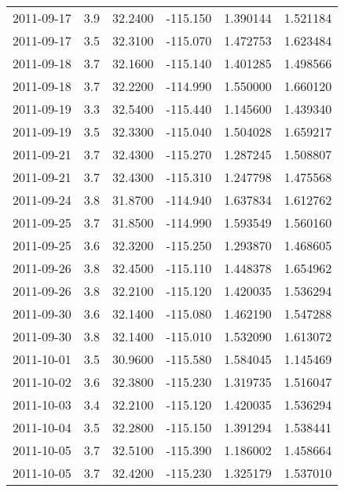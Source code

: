 \begin{tabular}{lrrrrr}
2011-09-17 &       3.9 &  32.2400 &  -115.150 &         1.390144 &         1.521184 \\
2011-09-17 &       3.5 &  32.3100 &  -115.070 &         1.472753 &         1.623484 \\
2011-09-18 &       3.7 &  32.1600 &  -115.140 &         1.401285 &         1.498566 \\
2011-09-18 &       3.7 &  32.2200 &  -114.990 &         1.550000 &         1.660120 \\
2011-09-19 &       3.3 &  32.5400 &  -115.440 &         1.145600 &         1.439340 \\
2011-09-19 &       3.5 &  32.3300 &  -115.040 &         1.504028 &         1.659217 \\
2011-09-21 &       3.7 &  32.4300 &  -115.270 &         1.287245 &         1.508807 \\
2011-09-21 &       3.7 &  32.4300 &  -115.310 &         1.247798 &         1.475568 \\
2011-09-24 &       3.8 &  31.8700 &  -114.940 &         1.637834 &         1.612762 \\
2011-09-25 &       3.7 &  31.8500 &  -114.990 &         1.593549 &         1.560160 \\
2011-09-25 &       3.6 &  32.3200 &  -115.250 &         1.293870 &         1.468605 \\
2011-09-26 &       3.8 &  32.4500 &  -115.110 &         1.448378 &         1.654962 \\
2011-09-26 &       3.8 &  32.2100 &  -115.120 &         1.420035 &         1.536294 \\
2011-09-30 &       3.6 &  32.1400 &  -115.080 &         1.462190 &         1.547288 \\
2011-09-30 &       3.8 &  32.1400 &  -115.010 &         1.532090 &         1.613072 \\
2011-10-01 &       3.5 &  30.9600 &  -115.580 &         1.584045 &         1.145469 \\
2011-10-02 &       3.6 &  32.3800 &  -115.230 &         1.319735 &         1.516047 \\
2011-10-03 &       3.4 &  32.2100 &  -115.120 &         1.420035 &         1.536294 \\
2011-10-04 &       3.5 &  32.2800 &  -115.150 &         1.391294 &         1.538441 \\
2011-10-05 &       3.7 &  32.5100 &  -115.390 &         1.186002 &         1.458664 \\
2011-10-05 &       3.7 &  32.4200 &  -115.230 &         1.325179 &         1.537010 \\

\end{tabular}
